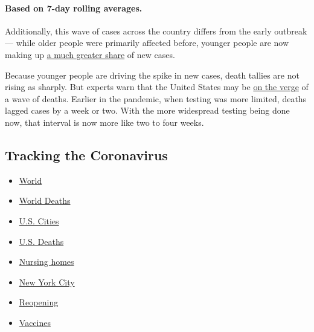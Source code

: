 \hypertarget{based-on-7-day-rolling-averages}{%
\paragraph{Based on 7-day rolling
averages.}\label{based-on-7-day-rolling-averages}}

Additionally, this wave of cases across the country differs from the
early outbreak --- while older people were primarily affected before,
younger people are now making up
\href{https://www.nytimes.com/2020/06/25/us/coronavirus-cases-young-people.html}{a
much greater share} of new cases.

Because younger people are driving the spike in new cases, death tallies
are not rising as sharply. But experts warn that the United States may
be
\href{https://www.nytimes.com/2020/07/03/health/coronavirus-mortality-testing.html}{on
the verge} of a wave of deaths. Earlier in the pandemic, when testing
was more limited, deaths lagged cases by a week or two. With the more
widespread testing being done now, that interval is now more like two to
four weeks.

\hypertarget{tracking-the-coronavirus}{%
\subsection{Tracking the Coronavirus}\label{tracking-the-coronavirus}}

\begin{itemize}
\tightlist
\item
  \href{https://www.nytimes.com/interactive/2020/world/coronavirus-maps.html}{World}
\item
  \href{https://www.nytimes.com/interactive/2020/04/21/world/coronavirus-missing-deaths.html}{World
  Deaths}
\item
  \href{https://www.nytimes.com/interactive/2020/04/23/upshot/five-ways-to-monitor-coronavirus-outbreak-us.html}{U.S.
  Cities}
\item
  \href{https://www.nytimes.com/interactive/2020/05/05/us/coronavirus-death-toll-us.html}{U.S.
  Deaths}
\item
  \href{https://www.nytimes.com/interactive/2020/us/coronavirus-nursing-homes.html}{Nursing
  homes}
\item
  \href{https://www.nytimes.com/interactive/2020/nyregion/new-york-city-coronavirus-cases.html}{New
  York City}
\item
  \href{https://www.nytimes.com/interactive/2020/us/states-reopen-map-coronavirus.html}{Reopening}
\item
  \href{https://www.nytimes.com/interactive/2020/science/coronavirus-vaccine-tracker.html}{Vaccines}
\end{itemize}

